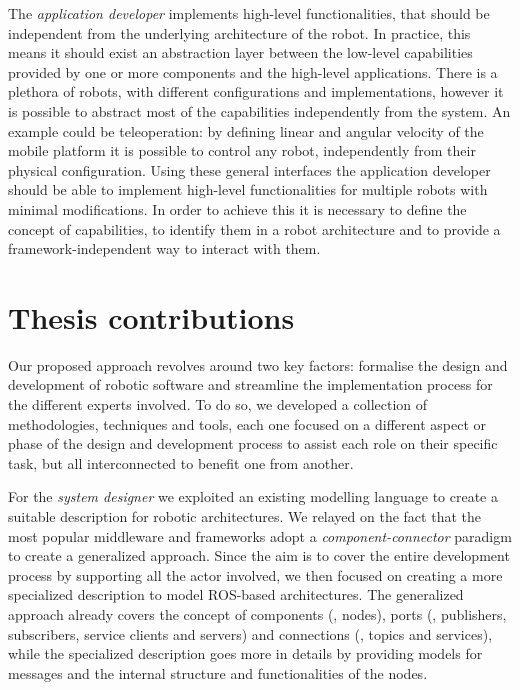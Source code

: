 The \textit{application developer} implements high-level functionalities, that should be independent from the underlying architecture of the robot. In practice, this means it should exist an abstraction layer between the low-level capabilities provided by one or more components and the high-level applications. There is a plethora of robots, with different configurations and implementations, however it is possible to abstract most of the capabilities independently from the system. An example could be teleoperation: by defining linear and angular velocity of the mobile platform it is possible to control any robot, independently from their physical configuration. Using these general interfaces the application developer should be able to implement high-level functionalities for multiple robots with minimal modifications. In order to achieve this it is necessary to define the concept of capabilities, to identify them in a robot architecture and to provide a framework-independent way to interact with them.

\section{Thesis contributions}
Our proposed approach revolves around two key factors: formalise the design and development of robotic software and streamline the implementation process for the different experts involved. To do so, we developed a collection of methodologies, techniques and tools, each one focused on a different aspect or phase of the design and development process to assist each role on their specific task, but all interconnected to benefit one from another.

For the \textit{system designer} we exploited an existing modelling language to create a suitable description for robotic architectures. We relayed on the fact that the most popular middleware and frameworks adopt a \textit{component-connector} paradigm to create a generalized approach. Since the aim is to cover the entire development process by supporting all the actor involved, we then focused on creating a more specialized description to model ROS-based architectures. The generalized approach already covers the concept of components (\ie, nodes), ports (\ie, publishers, subscribers, service clients and servers) and connections (\ie, topics and services), while the specialized description goes more in details by providing models for messages and the internal structure and functionalities of the nodes.

